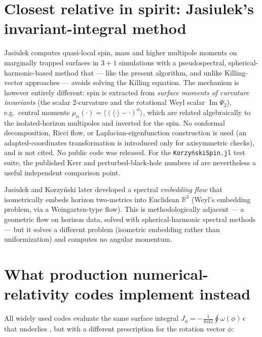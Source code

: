 \documentclass[11pt]{article}
\begin{document}
\section{Closest relative in spirit: Jasiulek's invariant-integral method}

Jasiulek \cite{jasiulek2009} computes quasi-local spin, mass and higher
multipole moments on marginally trapped surfaces in $3+1$ simulations with a
pseudospectral, spherical-harmonic-based method that --- like the present
algorithm, and unlike Killing-vector approaches --- avoids solving the
Killing equation.  The mechanism is however entirely different: spin is
extracted from \emph{surface moments of curvature invariants} (the scalar
2-curvature and the rotational Weyl scalar $\operatorname{Im}\Psi_2$), e.g.\
central moments $\mu_n(\cdot) = \langle(\langle\cdot\rangle-\cdot)^n\rangle$,
which are related algebraically to the isolated-horizon multipoles and
inverted for the spin.  No conformal decomposition, Ricci flow, or
Laplacian-eigenfunction construction is used (an adapted-coordinates
transformation is introduced only for axisymmetric checks), and
\cite{korzynski2007} is not cited.  No public code was released.  For the
\texttt{KorzyńskiSpin.jl} test suite, the published Kerr and
perturbed-black-hole numbers of \cite{jasiulek2009} are nevertheless a
useful independent comparison point.

Jasiulek and Korzy\'nski later developed a spectral \emph{embedding flow}
\cite{jasiulek2012} that isometrically embeds horizon two-metrics into
Euclidean $\mathbb{R}^3$ (Weyl's embedding problem, via a Weingarten-type
flow).  This is methodologically adjacent --- a geometric flow on horizon
data, solved with spherical-harmonic spectral methods --- but it solves a
different problem (isometric embedding rather than uniformization) and
computes no angular momentum.

\section{What production numerical-relativity codes implement instead}

All widely used codes evaluate the same surface integral
$J_\phi = -\frac{1}{8\pi G}\oint\omega(\phi)\,\epsilon$ that underlies
\cite{korzynski2007}, but with a different prescription for the rotation
vector $\phi$:
\end{document}
